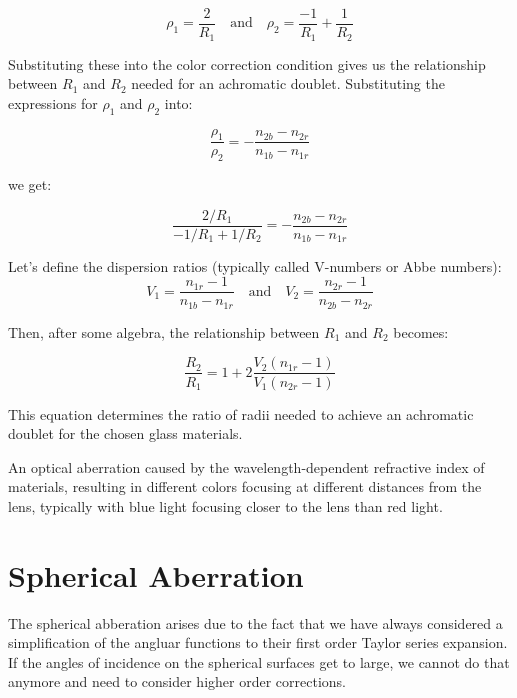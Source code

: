 \documentclass[
  a4paper,
]{book}
\begin{document}
\[
\rho_1=\frac{2}{R_1} \quad \text{and} \quad \rho_2=\frac{-1}{R_1}+\frac{1}{R_2}
\]

Substituting these into the color correction condition gives us the
relationship between \(R_1\) and \(R_2\) needed for an achromatic
doublet. Substituting the expressions for \(\rho_1\) and \(\rho_2\)
into:

\[
\frac{\rho_1}{\rho_2}=-\frac{n_{2b}-n_{2r}}{n_{1b}-n_{1r}}
\]

we get:

\[
\frac{2/R_1}{-1/R_1+1/R_2}=-\frac{n_{2b}-n_{2r}}{n_{1b}-n_{1r}}
\]

Let's define the dispersion ratios (typically called V-numbers or Abbe
numbers): \[
V_1=\frac{n_{1r}-1}{n_{1b}-n_{1r}} \quad \text{and} \quad V_2=\frac{n_{2r}-1}{n_{2b}-n_{2r}}
\]

Then, after some algebra, the relationship between \(R_1\) and \(R_2\)
becomes:

\[
\frac{R_2}{R_1}=1+2\frac{V_2(n_{1r}-1)}{V_1(n_{2r}-1)}
\]

This equation determines the ratio of radii needed to achieve an
achromatic doublet for the chosen glass materials.

\begin{tcolorbox}[enhanced jigsaw, breakable, toptitle=1mm, bottomrule=.15mm, colbacktitle=quarto-callout-note-color!10!white, title=\textcolor{quarto-callout-note-color}{\faInfo}\hspace{0.5em}{Chromatic Aberration}, arc=.35mm, rightrule=.15mm, bottomtitle=1mm, opacityback=0, toprule=.15mm, coltitle=black, leftrule=.75mm, opacitybacktitle=0.6, colback=white, left=2mm, titlerule=0mm, colframe=quarto-callout-note-color-frame]

An optical aberration caused by the wavelength-dependent refractive
index of materials, resulting in different colors focusing at different
distances from the lens, typically with blue light focusing closer to
the lens than red light.

\end{tcolorbox}

\section{Spherical Aberration}\label{spherical-aberration}

The spherical abberation arises due to the fact that we have always
considered a simplification of the angluar functions to their first
order Taylor series expansion. If the angles of incidence on the
spherical surfaces get to large, we cannot do that anymore and need to
consider higher order corrections.
\end{document}
